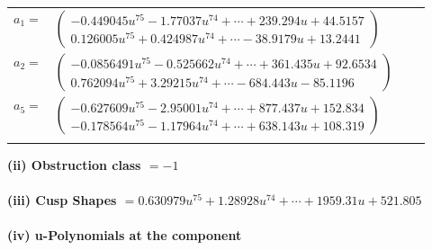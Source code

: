 \documentclass[1p]{elsarticle_modified}
\theoremstyle{definition}
\begin{document}
\begin{tabular}{m{7pt} m{180pt} m{7pt} m{180pt} }
\flushright $a_{1}=$&$\begin{pmatrix}-0.449045 u^{75}-1.77037 u^{74}+\cdots+239.294 u+44.5157\\0.126005 u^{75}+0.424987 u^{74}+\cdots-38.9179 u+13.2441\end{pmatrix}$ \\
\flushright $a_{2}=$&$\begin{pmatrix}-0.0856491 u^{75}-0.525662 u^{74}+\cdots+361.435 u+92.6534\\0.762094 u^{75}+3.29215 u^{74}+\cdots-684.443 u-85.1196\end{pmatrix}$ \\
\flushright $a_{5}=$&$\begin{pmatrix}-0.627609 u^{75}-2.95001 u^{74}+\cdots+877.437 u+152.834\\-0.178564 u^{75}-1.17964 u^{74}+\cdots+638.143 u+108.319\end{pmatrix}$\\&\end{tabular}
\flushleft \textbf{(ii) Obstruction class $= -1$}\\~\\
\flushleft \textbf{(iii) Cusp Shapes $= 0.630979 u^{75}+1.28928 u^{74}+\cdots+1959.31 u+521.805$}\\~\\
\newpage\renewcommand{\arraystretch}{1}
\flushleft \textbf{(iv) u-Polynomials at the component}\newline \\
\end{document}

